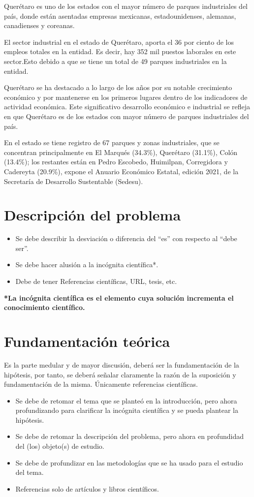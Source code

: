     Querétaro es uno de los estados con el mayor número de parques industriales del país, donde están asentadas empresas mexicanas, estadounidenses, alemanas, canadienses y coreanas.
    
    El sector industrial en el estado de Querétaro, aporta el 36 por ciento de los empleos totales en la entidad. Es decir, hay 352 mil puestos laborales en este sector.Esto debido a que se tiene un total de 49 parques industriales en la entidad.
    
    Querétaro se ha destacado a lo largo de los años por su notable crecimiento económico y por mantenerse en los primeros lugares dentro de los indicadores de actividad económica. Este significativo desarrollo económico e industrial se refleja en que Querétaro es de los estados con mayor número de parques industriales del país. \cite{JessicaIgnot}
    
    En el estado se tiene registro de 67 parques y zonas industriales, que se concentran principalmente en El Marqués (34.3\%), Querétaro (31.1\%), Colón (13.4\%); los restantes están en Pedro Escobedo, Huimilpan, Corregidora y Cadereyta (20.9\%), expone el Anuario Económico Estatal, edición 2021, de la Secretaría de Desarrollo Sustentable (Sedesu).



% 
% 
\section{Descripción del problema}
\begin{itemize}
    \item Se debe describir la desviación o diferencia del ``es'' con respecto al ``debe ser''.
    \item Se debe hacer alusión a la incógnita científica*.
    \item Debe de tener Referencias científicas, URL, tesis, etc.
\end{itemize}

\textbf{*La incógnita científica es el elemento cuya solución incrementa el conocimiento científico.}
% 
% 
\section{Fundamentación teórica}

Es la parte medular y de mayor discusión, deberá ser la fundamentación de la hipótesis, por tanto, se deberá señalar claramente la razón de la suposición y fundamentación de la misma. Únicamente referencias científicas.
\begin{itemize}
    \item Se debe de retomar el tema que se planteó en la introducción, pero ahora profundizando para clarificar la incógnita científica y se pueda plantear la hipótesis.
    \item Se debe de retomar la descripción del problema, pero ahora en profundidad del (los) objeto(s) de estudio. 
    \item Se debe de profundizar en las metodologías que se ha usado para el estudio del tema.
    \item Referencias solo de artículos y libros científicos.
\end{itemize}
% 
% 
